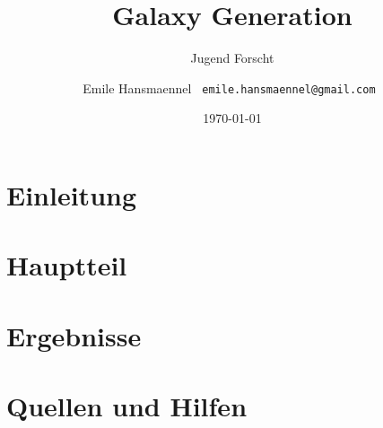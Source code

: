\documentclass[a4paper,12pt]{scrartcl}
\begin{document}
\title{Galaxy Generation}
\subtitle{Jugend Forscht \the\year}
\author{ Emile Hansmaennel \texttt{ emile.hansmaennel@gmail.com }}
\date{\today}

\maketitle



\thispagestyle{empty}
\clearpage
\newpage
\setcounter{page}{1}

\tableofcontents
\newpage

\section{Einleitung} \label{Einleitung}

\newpage

\section{Hauptteil} \label{Hauptteil}

\newpage

\section{Ergebnisse} \label{ergebnisse}

\newpage

\section{Quellen und Hilfen} \label{quellen}

\end{document}
